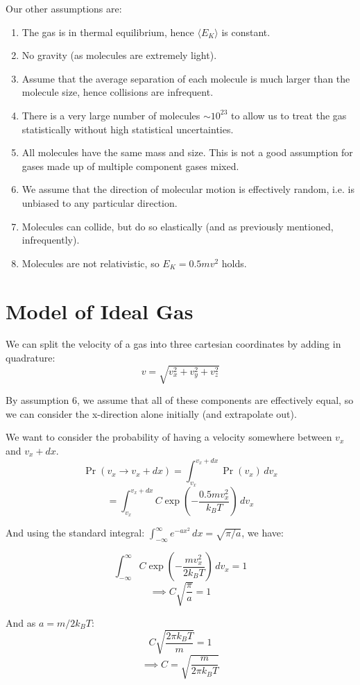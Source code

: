 Our other assumptions are:
\begin{enumerate}
    \item The gas is in thermal equilibrium, hence $\langle E_K\rangle$ is constant.
    \item No gravity (as molecules are extremely light).
    \item Assume that the average separation of each molecule is much larger than the molecule size, hence collisions are infrequent.
    \item There is a very large number of molecules $\sim 10^{23}$ to allow us to treat the gas statistically without high statistical uncertainties.
    \item All molecules have the same mass and size. This is not a good assumption for gases made up of multiple component gases mixed.
    \item We assume that the direction of molecular motion is effectively random, i.e. is unbiased to any particular direction.
    \item Molecules can collide, but do so elastically (and as previously mentioned, infrequently).
    \item Molecules are not relativistic, so $E_K = 0.5 mv^2$ holds.
\end{enumerate}

\section{Model of Ideal Gas}
We can split the velocity of a gas into three cartesian coordinates by adding in quadrature:
\[
    v = \sqrt{v_x^2 + v_y^2 + v_z^2}
\]

By assumption 6, we assume that all of these components are effectively equal, so we can consider the x-direction alone initially (and extrapolate out).

We want to consider the probability of having a velocity somewhere between $v_x$ and $v_x + dx$.
\[
    \Pr(v_x \to v_x + dx) = \int_{v_x}^{v_x + dx} \Pr(v_x) \, dv_x
\]
\[
    = \int_{v_x}^{v_x + dx} C \exp\left(- \frac{0.5 m v_x^2}{k_B T}\right) \, dv_x
\]

And using the standard integral: $\int_{-\infty}^{\infty} e^{-ax^2} \, dx = \sqrt{\pi / a}$, we have:

\[
    \int_{-\infty}^{\infty} C \exp \left(- \frac{mv_x^2}{2k_B T}\right) \, dv_x = 1
\]
\[
    \implies C \sqrt{\frac{\pi}{a}} = 1
\]

And as $a = m/2k_BT$:
\[
    C \sqrt{\frac{2 \pi k_B T}{m}} = 1
\]
\[
    \implies C = \sqrt{\frac{m}{2 \pi k_B T}}
\]

